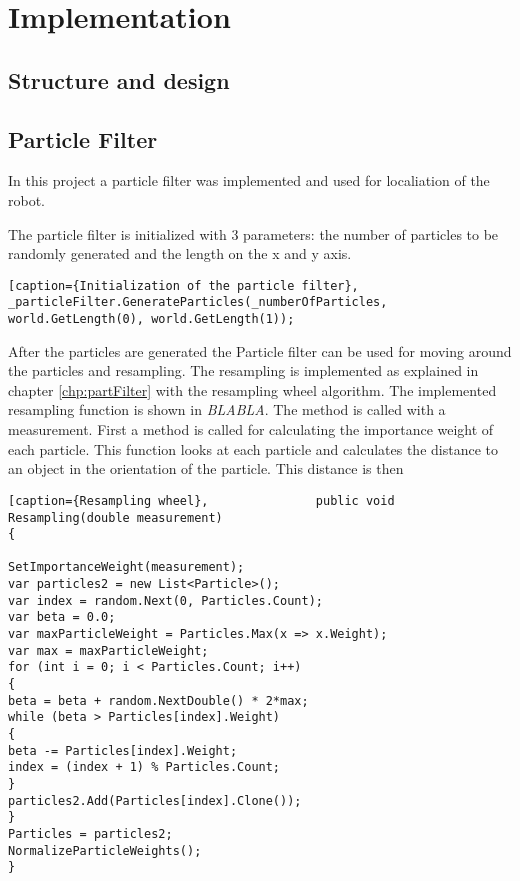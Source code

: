 \chapter{Implementation}
\label{chp:impl}

\section{Structure and design}


\section{Particle Filter}
In this project a particle filter was implemented and used for localiation of the robot.

The particle filter is initialized with 3 parameters: the number of particles to be randomly generated and the length on the x and y axis.

\begin{lstlisting}[caption={Initialization of the particle filter},             _particleFilter.GenerateParticles(_numberOfParticles, world.GetLength(0), world.GetLength(1));
\end{lstlisting}

After the particles are generated the Particle filter can be used for moving around the particles and resampling. The resampling is implemented as explained in chapter \ref{chp:partFilter} with the resampling wheel algorithm. The implemented resampling function is shown in \emph{BLABLA}. The method is called with a measurement. First a method is called for calculating the importance weight of each particle. This function looks at each particle and calculates the distance to an object in the orientation of the particle. This distance is then 

\begin{lstlisting}[caption={Resampling wheel},               public void Resampling(double measurement)
{

SetImportanceWeight(measurement);
var particles2 = new List<Particle>();
var index = random.Next(0, Particles.Count);
var beta = 0.0;
var maxParticleWeight = Particles.Max(x => x.Weight);
var max = maxParticleWeight;
for (int i = 0; i < Particles.Count; i++)
{
beta = beta + random.NextDouble() * 2*max;
while (beta > Particles[index].Weight)
{
beta -= Particles[index].Weight;
index = (index + 1) % Particles.Count;
}
particles2.Add(Particles[index].Clone());
}
Particles = particles2;
NormalizeParticleWeights();
}
\end{lstlisting}



